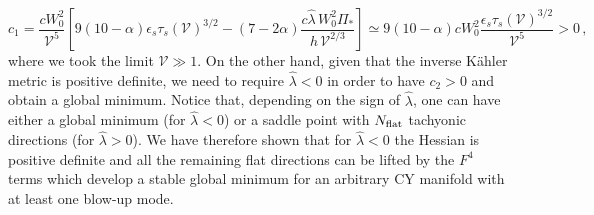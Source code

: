 \documentclass[11pt,a4paper]{article}
\newcommand{\be}{\begin{equation}}
\newcommand{\ee}{\end{equation}}
\newcommand\vo{{\mathcal{V}}}
\begin{document}
\be
c_1 = \frac{c W_0^2}{\vo^5}\left[ 9(10- \alpha) \epsilon_s \tau_s(\vo)^{3/2} - (7-2\alpha) \frac{c\hat\lambda\,W_0^2 \Pi_*}{h\,\vo^{2/3}}\right]
\simeq 9(10- \alpha) c W_0^2\frac{\epsilon_s \tau_s(\vo)^{3/2}}{\vo^5}>0\,, \nonumber
\ee
where we took the limit $\vo\gg 1$. On the other hand, given that the inverse K\"ahler metric is positive definite, we need to require $\hat\lambda<0$ in order to have $c_2>0$ and obtain a global minimum. Notice that, depending on the sign of $\hat\lambda$, one can have either a global minimum (for $\hat\lambda<0$) or a saddle point with $N_{\rm flat}$ tachyonic directions (for $\hat\lambda>0$). We have therefore shown that for $\hat\lambda<0$ the Hessian is positive definite and all the remaining flat directions can be lifted by the $F^4$ terms which develop a stable global minimum for an arbitrary CY manifold with at least one blow-up mode.
\end{document}
